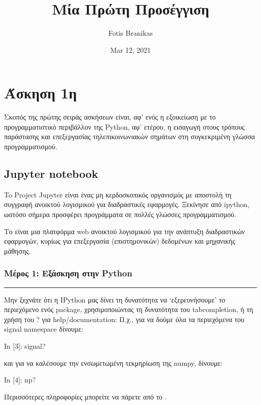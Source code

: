 \documentclass[letterpaper,10pt,english]{sphinxmanual}
\title{Μία Πρώτη Προσέγγιση}
\date{Mar 12, 2021}
\author{Fotis Branikas}
\begin{document}
\pagestyle{empty}
\sphinxmaketitle
\pagestyle{plain}

\pagestyle{normal}

\section*{Άσκηση 1η}
\label{\detokenize{Exercise1_0:id1}}\label{\detokenize{Exercise1_0::doc}}
\sphinxAtStartPar
Σκοπός της πρώτης σειράς ασκήσεων είναι, αφ’ ενός η εξοικείωση με το προγραμματιστικό περιβάλλον της Python, αφ’ ετέρου, η εισαγωγή στους τρόπους παράστασης και επεξεργασίας τηλεπικοινωνιακών σημάτων στη συγκεκριμένη γλώσσα προγραμματισμού.


\subsection*{Jupyter notebook}
\label{\detokenize{Exercise1_0:jupyter-notebook}}
\sphinxAtStartPar
To Project Jupyter είναι ένας μη κερδοσκοπικός οργανισμός με αποστολή τη συγγραφή ανοικτού λογισμικού για διαδραστικές εφαρμογές. Ξεκίνησε από ipython, ωστόσο σήμερα προσφέρει προγράμματα σε πολλές γλώσσες προγραμματισμού.

\sphinxAtStartPar
Το  είναι μια πλατφόρμα web ανοικτού λογισμικού για την ανάπτυξη διαδραστικών εφαρμογών, κυρίως για επεξεργασία (επιστημονικών) δεδομένων και μηχανικής μάθησης.


\subsubsection*{Μέρος 1:  Εξάσκηση στην Python}
\label{\detokenize{Exercise1_1:python}}\label{\detokenize{Exercise1_1::doc}}

\bigskip\hrule\bigskip


\sphinxAtStartPar
Μην ξεχνάτε ότι η IPython μας δίνει τη δυνατότητα να ‘εξερευνήσουμε’ το περιεχόμενο ενός package, χρησιμοποιώντας τη δυνατότητα του tab\sphinxhyphen{}completion, ή τη χρήση του ? για help/documentation:
Π.χ., για να δούμε όλα τα περιεχόμενα του signal namespace δίνουμε:

\sphinxAtStartPar
In {[}3{]}: signal?

\sphinxAtStartPar
και για να καλέσουμε την ενσωμετωμένη τεκμηρίωση της numpy, δίνουμε:

\sphinxAtStartPar
In {[}4{]}: np?

\sphinxAtStartPar
Περισσότερες πληροφορίες μπορείτε να πάρετε από το .
\end{document}
